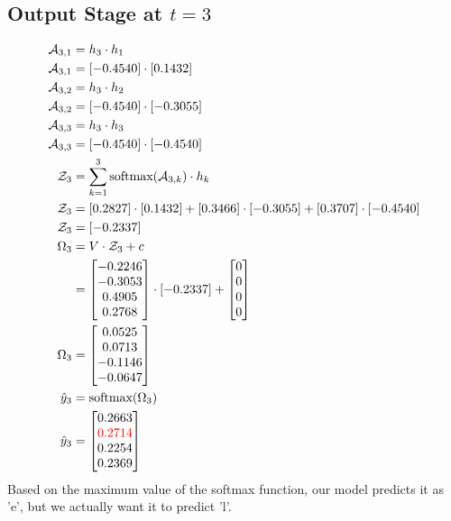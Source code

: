 \documentclass{article}
\begin{document}
\subsection*{Output Stage at $t=3$}
\begin{align*}
\mathcal{A}_{3,1} &= h_3 \cdot h_1 \\
\mathcal{A}_{3,1} &= [-0.4540] \cdot [0.1432] \\
\mathcal{A}_{3,2} &= h_3 \cdot h_2 \\
\mathcal{A}_{3,2} &= [-0.4540] \cdot [-0.3055] \\
\mathcal{A}_{3,3} &= h_3 \cdot h_3 \\
\mathcal{A}_{3,3} &= [-0.4540] \cdot [-0.4540] \\
\mathcal{Z}_3 &= \sum_{k=1}^3 \text{softmax}(\mathcal{A}_{3,k}) \cdot h_k \\
\mathcal{Z}_3 &= [0.2827] \cdot [0.1432] + [0.3466] \cdot [-0.3055]+ [0.3707] \cdot [-0.4540]\\
\mathcal{Z}_3 &= [-0.2337] \\
\Omega_3 &= V \cdot \mathcal{Z}_3 + c \\
 &= \begin{bmatrix} -0.2246 \\ -0.3053 \\ 0.4905 \\ 0.2768 \end{bmatrix} \cdot [-0.2337] + \begin{bmatrix} 0 \\ 0 \\ 0 \\ 0\end{bmatrix}\\
\Omega_3 &= \begin{bmatrix} 0.0525 \\ 0.0713 \\ -0.1146 \\ -0.0647 \end{bmatrix} \\
\hat{y}_3 &= \text{softmax}(\Omega_3) \\
\hat{y}_3 &= \begin{bmatrix} 0.2663 \\ \textcolor{red}{0.2714} \\ 0.2254 \\ 0.2369 \end{bmatrix} \\
\end{align*}
Based on the maximum value of the softmax function, our model predicts it as 'e', but we actually want it to predict 'l'.
\end{document}

